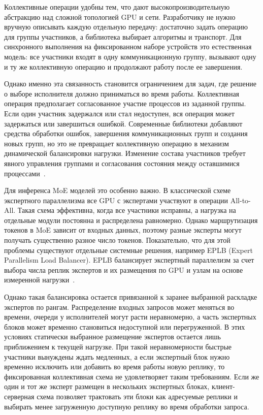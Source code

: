 Коллективные операции удобны тем, что дают высокопроизводительную абстракцию над сложной топологией GPU и сети. Разработчику не нужно вручную описывать каждую отдельную передачу: достаточно задать операцию для группы участников, а библиотека выбирает алгоритмы и транспорт. Для синхронного выполнения на фиксированном наборе устройств это естественная модель: все участники входят в одну коммуникационную группу, вызывают одну и ту же коллективную операцию и продолжают работу после ее завершения.

Однако именно эта связанность становится ограничением для задач, где решение о выборе исполнителя должно приниматься во время работы. Коллективная операция предполагает согласованное участие процессов из заданной группы. Если один участник задержался или стал недоступен, вся операция может задержаться или завершиться ошибкой. Современные библиотеки добавляют средства обработки ошибок, завершения коммуникационных групп и создания новых групп, но это не превращает коллективную операцию в механизм динамической балансировки нагрузки. Изменение состава участников требует явного управления группами и согласования состояния между оставшимися процессами~\cite{nvidiaNCCLDocs}.

Для инференса MoE моделей это особенно важно. В классической схеме экспертного параллелизма все GPU с экспертами участвуют в операции All-to-All. Такая схема эффективна, когда все участники исправны, а нагрузка на отдельные модули постоянна и распределена равномерно. Однако маршрутизация токенов в MoE зависит от входных данных, поэтому разные эксперты могут получать существенно разное число токенов. Показательно, что для этой проблемы существуют отдельные системные решения, например EPLB (Expert Parallelism Load Balancer). EPLB балансирует экспертный параллелизм за счет выбора числа реплик экспертов и их размещения по GPU и узлам на основе измеренной нагрузки~\cite{deepseekEPLB}.

Однако такая балансировка остается привязанной к заранее выбранной раскладке экспертов по рангам. Распределение входных запросов может меняться во времени, очереди у исполнителей могут расти неравномерно, а часть экспертных блоков может временно становиться недоступной или перегруженной. В этих условиях статически выбранное размещение экспертов остается лишь приближением к текущей нагрузке. При такой неравномерности быстрые участники вынуждены ждать медленных, а если экспертный блок нужно временно исключить или добавить во время работы новую реплику, то фиксированная коллективная схема не удовлетворяет таким требованиям. Если же один и тот же эксперт размещен в нескольких экспертных блоках, клиент-серверная схема позволяет трактовать эти блоки как адресуемые реплики и выбирать менее загруженную доступную реплику во время обработки запроса.

